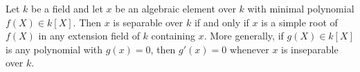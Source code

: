 Let $k$ be a field and let $x$ be an algebraic element over $k$ with minimal polynomial $f(X) \in k[X]$. Then $x$ is separable over $k$ if and only if $x$ is a simple root of $f(X)$ in any extension field of $k$ containing $x$. More generally, if $g(X) \in k[X]$ is any polynomial with $g(x) = 0$, then $g'(x) = 0$ whenever $x$ is inseparable over $k$.
